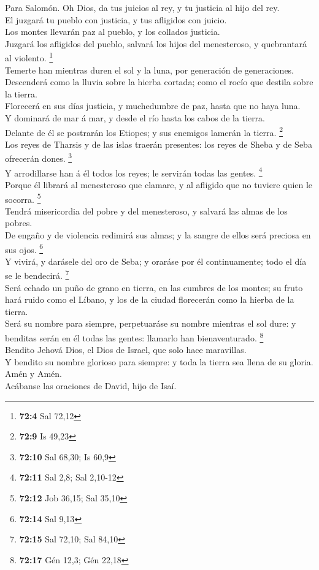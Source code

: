  Para Salomón. Oh Dios, da tus juicios al rey, y tu justicia
al hijo del rey.\\
 El juzgará tu pueblo con justicia, y tus afligidos con
juicio.\\
 Los montes llevarán paz al pueblo, y los collados
justicia.\\
 Juzgará los afligidos del pueblo, salvará los hijos del
menesteroso, y quebrantará al violento. \footnote{\textbf{72:4} Sal
  72,12}\\
 Temerte han mientras duren el sol y la luna, por generación
de generaciones.\\
 Descenderá como la lluvia sobre la hierba cortada; como el
rocío que destila sobre la tierra.\\
 Florecerá en sus días justicia, y muchedumbre de paz, hasta
que no haya luna.\\
 Y dominará de mar á mar, y desde el río hasta los cabos de
la tierra.\\
 Delante de él se postrarán los Etiopes; y sus enemigos
lamerán la tierra. \footnote{\textbf{72:9} Is 49,23}\\
 Los reyes de Tharsis y de las islas traerán presentes: los
reyes de Sheba y de Seba ofrecerán dones. \footnote{\textbf{72:10} Sal
  68,30; Is 60,9}\\
 Y arrodillarse han á él todos los reyes; le servirán todas
las gentes. \footnote{\textbf{72:11} Sal 2,8; Sal 2,10-12}\\
 Porque él librará al menesteroso que clamare, y al
afligido que no tuviere quien le socorra. \footnote{\textbf{72:12} Job
  36,15; Sal 35,10}\\
 Tendrá misericordia del pobre y del menesteroso, y salvará
las almas de los pobres.\\
 De engaño y de violencia redimirá sus almas; y la sangre
de ellos será preciosa en sus ojos. \footnote{\textbf{72:14} Sal 9,13}\\
 Y vivirá, y darásele del oro de Seba; y oraráse por él
continuamente; todo el día se le bendecirá. \footnote{\textbf{72:15} Sal
  72,10; Sal 84,10}\\
 Será echado un puño de grano en tierra, en las cumbres de
los montes; su fruto hará ruido como el Líbano, y los de la ciudad
florecerán como la hierba de la tierra.\\
 Será su nombre para siempre, perpetuaráse su nombre
mientras el sol dure: y benditas serán en él todas las gentes: llamarlo
han bienaventurado. \footnote{\textbf{72:17} Gén 12,3; Gén 22,18}\\
 Bendito Jehová Dios, el Dios de Israel, que solo hace
maravillas.\\
 Y bendito su nombre glorioso para siempre: y toda la
tierra sea llena de su gloria. Amén y Amén.\\
 Acábanse las oraciones de David, hijo de Isaí.

